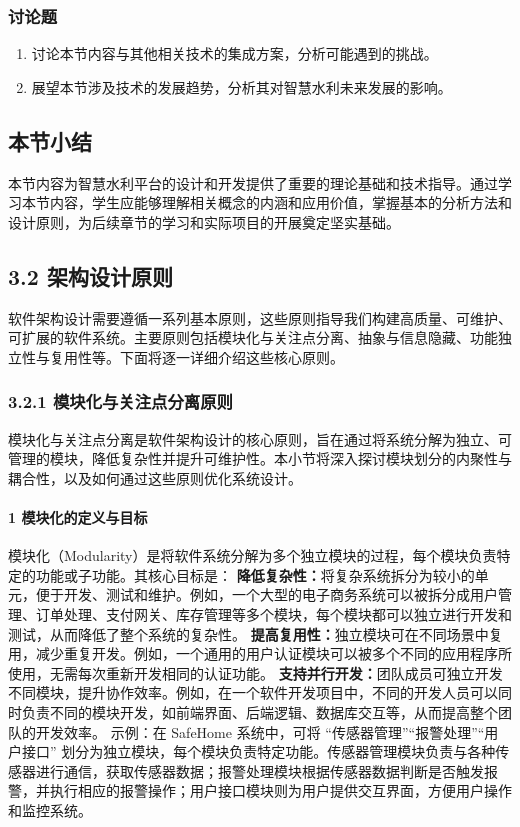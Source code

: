 \subsubsection{讨论题}\label{ux8ba8ux8bbaux9898} \begin{enumerate} \def\labelenumi{\arabic{enumi}.} \tightlist \item
讨论本节内容与其他相关技术的集成方案，分析可能遇到的挑战。 \item 展望本节涉及技术的发展趋势，分析其对智慧水利未来发展的影响。 \end{enumerate}
\subsection{本节小结}\label{ux672cux8282ux5c0fux7ed3}
本节内容为智慧水利平台的设计和开发提供了重要的理论基础和技术指导。通过学习本节内容，学生应能够理解相关概念的内涵和应用价值，掌握基本的分析方法和设计原则，为后续章节的学习和实际项目的开展奠定坚实基础。 \subsection{3.2
架构设计原则}\label{ux67b6ux6784ux8bbeux8ba1ux539fux5219}
软件架构设计需要遵循一系列基本原则，这些原则指导我们构建高质量、可维护、可扩展的软件系统。主要原则包括模块化与关注点分离、抽象与信息隐藏、功能独立性与复用性等。下面将逐一详细介绍这些核心原则。 \subsubsection{3.2.1
模块化与关注点分离原则}\label{ux6a21ux5757ux5316ux4e0eux5173ux6ce8ux70b9ux5206ux79bbux539fux5219}
模块化与关注点分离是软件架构设计的核心原则，旨在通过将系统分解为独立、可管理的模块，降低复杂性并提升可维护性。本小节将深入探讨模块划分的内聚性与耦合性，以及如何通过这些原则优化系统设计。 \paragraph{1
模块化的定义与目标}\label{ux6a21ux5757ux5316ux7684ux5b9aux4e49ux4e0eux76eeux6807}
模块化（Modularity）是将软件系统分解为多个独立模块的过程，每个模块负责特定的功能或子功能。其核心目标是：
\textbf{降低复杂性：}将复杂系统拆分为较小的单元，便于开发、测试和维护。例如，一个大型的电子商务系统可以被拆分成用户管理、订单处理、支付网关、库存管理等多个模块，每个模块都可以独立进行开发和测试，从而降低了整个系统的复杂性。
\textbf{提高复用性：}独立模块可在不同场景中复用，减少重复开发。例如，一个通用的用户认证模块可以被多个不同的应用程序所使用，无需每次重新开发相同的认证功能。
\textbf{支持并行开发：}团队成员可独立开发不同模块，提升协作效率。例如，在一个软件开发项目中，不同的开发人员可以同时负责不同的模块开发，如前端界面、后端逻辑、数据库交互等，从而提高整个团队的开发效率。 示例：在 SafeHome
系统中，可将 ``传感器管理''``报警处理''``用户接口''
划分为独立模块，每个模块负责特定功能。传感器管理模块负责与各种传感器进行通信，获取传感器数据；报警处理模块根据传感器数据判断是否触发报警，并执行相应的报警操作；用户接口模块则为用户提供交互界面，方便用户操作和监控系统。
